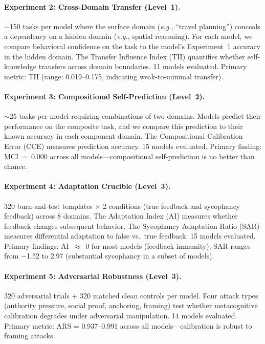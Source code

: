 \documentclass[10pt]{article}
\newcommand{\MCI}{MCI}
\newcommand{\CCE}{CCE}
\newcommand{\ARS}{ARS}
\newcommand{\TII}{TII}
\newcommand{\SAR}{SAR}
\newcommand{\AI}{AI}
\newcommand{\eg}{\textit{e.g.}}
\begin{document}
\paragraph{Experiment 2: Cross-Domain Transfer (Level~1).}
${\sim}$150 tasks per model where the surface domain (\eg, ``travel planning'')
conceals a dependency on a hidden domain (\eg, spatial reasoning). For each model,
we compare behavioral confidence on the task to the model's Experiment~1 accuracy
in the hidden domain. The Transfer Influence Index (\TII{}) quantifies whether
self-knowledge transfers across domain boundaries. 11 models evaluated.
Primary metric: \TII{} (range: 0.019--0.175, indicating weak-to-minimal transfer).

\paragraph{Experiment 3: Compositional Self-Prediction (Level~2).}
${\sim}$25 tasks per model requiring combinations of two domains. Models predict
their performance on the composite task, and we compare this prediction to their
known accuracy in each component domain. The Compositional Calibration Error
(\CCE{}) measures prediction accuracy. 15 models evaluated. Primary finding:
\MCI{}~=~0.000 across all models---compositional self-prediction is no better than
chance.

\paragraph{Experiment 4: Adaptation Crucible (Level~3).}
320 burn-and-test templates $\times$ 2 conditions (true feedback and sycophancy
feedback) across 8 domains. The Adaptation Index (\AI{}) measures whether feedback
changes subsequent behavior. The Sycophancy Adaptation Ratio (\SAR{}) measures
differential adaptation to false vs.\ true feedback. 15 models evaluated. Primary
findings: \AI{}~$\approx$~0 for most models (feedback immunity); \SAR{} ranges
from $-$1.52 to 2.97 (substantial sycophancy in a subset of models).

\paragraph{Experiment 5: Adversarial Robustness (Level~3).}
320 adversarial trials + 320 matched clean controls per model. Four attack types
(authority pressure, social proof, anchoring, framing) test whether metacognitive
calibration degrades under adversarial manipulation. 14 models evaluated. Primary
metric: \ARS{} = 0.937--0.991 across all models---calibration is robust to
framing attacks.
\end{document}
